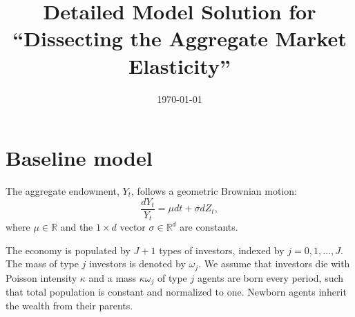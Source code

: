 \usepackage[en-US]{datetime2}
\usepackage{mathtools}
\usepackage{xcolor}

\usepackage{amsmath}
\usepackage{tikz}
\usepackage{mathdots}
\usepackage{cancel}
\usepackage{color}
\usepackage{siunitx}
\usepackage{array}
\usepackage{multirow}
\usepackage{amssymb}
\usepackage{gensymb}
\usepackage{tabularx}
\usepackage{extarrows}
\usepackage{booktabs}
\usetikzlibrary{fadings}
\usetikzlibrary{patterns}
\usetikzlibrary{shadows.blur}
\usetikzlibrary{shapes}



\newcommand{\comments}[1]
{\par {\bfseries \color{blue} #1 \par}}


\title{\textbf{Detailed Model Solution for\\ ``Dissecting the Aggregate Market Elasticity''}}

\author{}
\date{\today}
\maketitle
\doublespacing
\section{Baseline model}
The aggregate endowment, $Y_t$, follows a geometric Brownian motion:
\begin{equation}\label{eq:agg_endow}
	\frac{d Y_t}{Y_t} = \mu dt + \sigma dZ_t,
\end{equation}
where $\mu\in\mathbb{R}$ and the $1\times d$ vector $\sigma\in\mathbb{R}^d$ are constants.

The economy is populated by $J+1$ types of investors, indexed by $j = 0, 1, \ldots, J$. The mass of type $j$ investors is denoted by $\omega_j$. We assume that investors die with Poisson intensity $\kappa$ and a mass $\kappa \omega_j$ of type $j$ agents are born every period, such that total population is constant and normalized to one. 
Newborn agents inherit the wealth from their parents.
